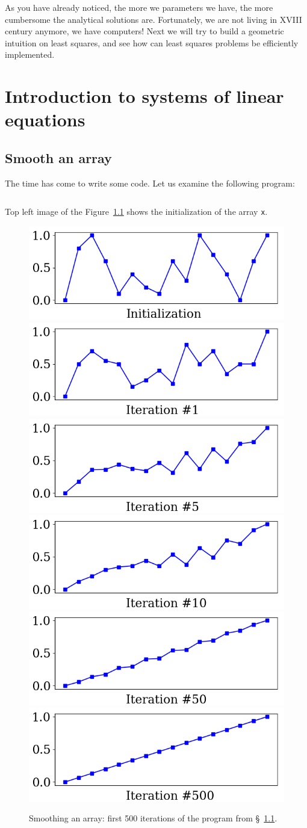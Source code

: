 \documentclass[notitlepage]{report}
\begin{document}
As you have already noticed, the more we parameters we have, the more cumbersome the analytical solutions are.
Fortunately, we are not living in XVIII century anymore, we have computers!
Next we will try to build a geometric intuition on least squares, and see how can least squares problems be efficiently implemented.


\chapter{Introduction to systems of linear equations}

\section{Smooth an array}
\label{sec:arraysmooth}
The time has come to write some code. Let us examine the following program:
\inputminted[frame=single,linenos=true]{python}{listings/example_3.1.py}

Top left image of the Figure~\ref{fig:linsys_smooth} shows the initialization of the array \texttt{x}.

\begin{figure}[ht]
    \centering
    \includegraphics[width=.32\linewidth]{example_3.1_0.png}
    \includegraphics[width=.32\linewidth]{example_3.1_1.png}
    \includegraphics[width=.32\linewidth]{example_3.1_2.png}
    \includegraphics[width=.32\linewidth]{example_3.1_3.png}
    \includegraphics[width=.32\linewidth]{example_3.1_4.png}
    \includegraphics[width=.32\linewidth]{example_3.1_5.png}
\caption{Smoothing an array: first 500 iterations of the program from \S~\ref{sec:arraysmooth}.}
    \label{fig:linsys_smooth}
\end{figure}
\end{document}
